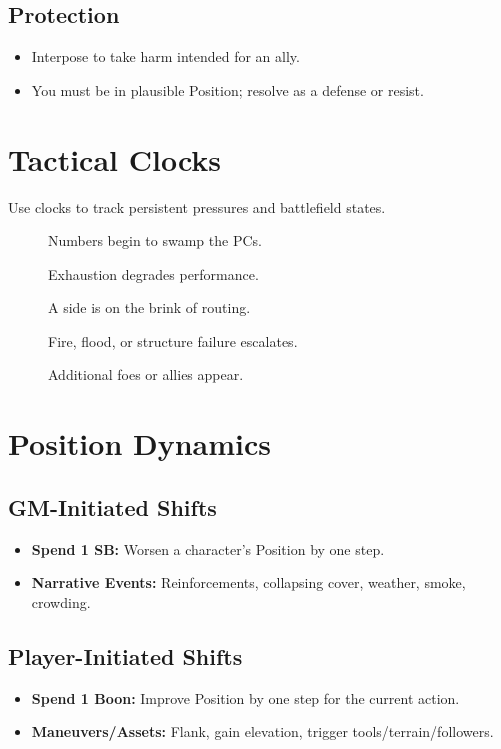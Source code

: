 \subsection{Protection}
\label{subsec:protection}
\begin{itemize}
  \item Interpose to take harm intended for an ally.
  \item You must be in plausible Position; resolve as a defense or resist.
\end{itemize}

\section{Tactical Clocks}
\label{sec:tactical-clocks}
Use clocks to track persistent pressures and battlefield states.
\begin{description}
  \item[] Numbers begin to swamp the PCs.
  \item[] Exhaustion degrades performance.
  \item[] A side is on the brink of routing.
  \item[] Fire, flood, or structure failure escalates.
  \item[] Additional foes or allies appear.
\end{description}

\section{Position Dynamics}
\label{sec:position-dynamics}
\subsection{GM-Initiated Shifts}
\label{subsec:gm-shifts}
\begin{itemize}
  \item \textbf{Spend 1 SB:} Worsen a character’s Position by one step. 
  \item \textbf{Narrative Events:} Reinforcements, collapsing cover, weather, smoke, crowding.
\end{itemize}
\subsection{Player-Initiated Shifts}
\label{subsec:player-shifts}
\begin{itemize}
  \item \textbf{Spend 1 Boon:} Improve Position by one step for the current action. 
  \item \textbf{Maneuvers/Assets:} Flank, gain elevation, trigger tools/terrain/followers.
\end{itemize}

